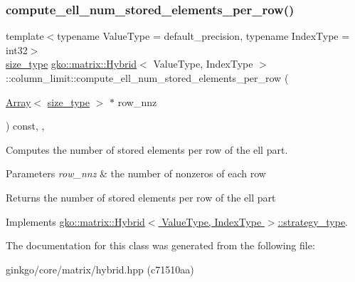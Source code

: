 \subsubsection{\texorpdfstring{compute\+\_\+ell\+\_\+num\+\_\+stored\+\_\+elements\+\_\+per\+\_\+row()}{compute\_ell\_num\_stored\_elements\_per\_row()}}
{\footnotesize\ttfamily template$<$typename Value\+Type = default\+\_\+precision, typename Index\+Type = int32$>$ \\
\hyperlink{namespacegko_a6e5c95df0ae4e47aab2f604a22d98ee7}{size\+\_\+type} \hyperlink{classgko_1_1matrix_1_1Hybrid}{gko\+::matrix\+::\+Hybrid}$<$ Value\+Type, Index\+Type $>$\+::column\+\_\+limit\+::compute\+\_\+ell\+\_\+num\+\_\+stored\+\_\+elements\+\_\+per\+\_\+row (\begin{DoxyParamCaption}\item[{\hyperlink{classgko_1_1Array}{Array}$<$ \hyperlink{namespacegko_a6e5c95df0ae4e47aab2f604a22d98ee7}{size\+\_\+type} $>$ $\ast$}]{row\+\_\+nnz }\end{DoxyParamCaption}) const\hspace{0.3cm}{\ttfamily [inline]}, {\ttfamily [override]}, {\ttfamily [virtual]}}



Computes the number of stored elements per row of the ell part. 


\begin{DoxyParams}{Parameters}
{\em row\+\_\+nnz} & the number of nonzeros of each row\\
\hline
\end{DoxyParams}
\begin{DoxyReturn}{Returns}
the number of stored elements per row of the ell part 
\end{DoxyReturn}


Implements \hyperlink{classgko_1_1matrix_1_1Hybrid_1_1strategy__type_a0a0cd4024f27c7d0f286f35fc0a6de60}{gko\+::matrix\+::\+Hybrid$<$ Value\+Type, Index\+Type $>$\+::strategy\+\_\+type}.



The documentation for this class was generated from the following file\+:\begin{DoxyCompactItemize}
\item 
ginkgo/core/matrix/hybrid.\+hpp (c71510aa)\end{DoxyCompactItemize}
